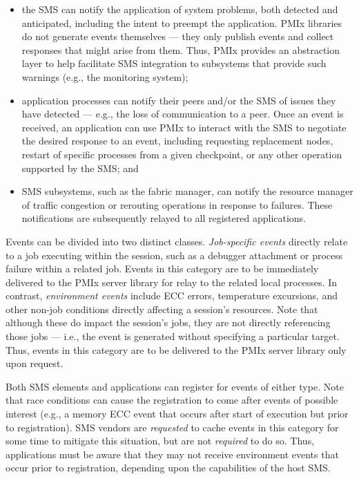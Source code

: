 \begin{itemize}
\item the \ac{SMS} can notify the application of system problems, both detected and anticipated, including the intent to preempt the application. \ac{PMIx} libraries do not generate events themselves --- they only publish events and collect responses that might arise from them. Thus, \ac{PMIx} provides an abstraction layer to help facilitate \ac{SMS} integration to subsystems that provide such warnings (e.g., the monitoring system);

\item application processes can notify their peers and/or the \ac{SMS} of issues they have detected --- e.g., the loss of communication to a peer. Once an event is received, an application can use \ac{PMIx} to interact with the \ac{SMS} to negotiate the desired response to an event, including requesting replacement nodes, restart of specific processes from a given checkpoint, or any other operation supported by the \ac{SMS}; and

\item \ac{SMS} subsystems, such as the fabric manager, can notify the resource manager of traffic congestion or rerouting operations in response to failures. These notifications are subsequently relayed to all registered applications.
\end{itemize}

Events can be divided into two distinct classes. \textit{Job-specific events} directly relate to a job executing within the session, such as a debugger attachment or process failure within a related job. Events in this category are to be immediately delivered to the \ac{PMIx} server library for relay to the related local processes. In contrast, \textit{environment events} include \ac{ECC} errors, temperature excursions, and other non-job conditions directly affecting a session's resources. Note that although these do impact the session's jobs, they are not directly referencing those jobs --- i.e., the event is generated without specifying a particular target. Thus, events in this category are to be delivered to the \ac{PMIx} server library only upon request.

Both \ac{SMS} elements and applications can register for events of either type. Note that race conditions can cause the registration to come after events of possible interest (e.g., a memory \ac{ECC} event that occurs after start of execution but prior to registration). \ac{SMS} vendors are \textit{requested} to cache events in this category for some time to mitigate this situation, but are not \textit{required} to do so. Thus, applications must be aware that they may not receive environment events that occur prior to registration, depending upon the capabilities of the host \ac{SMS}.

